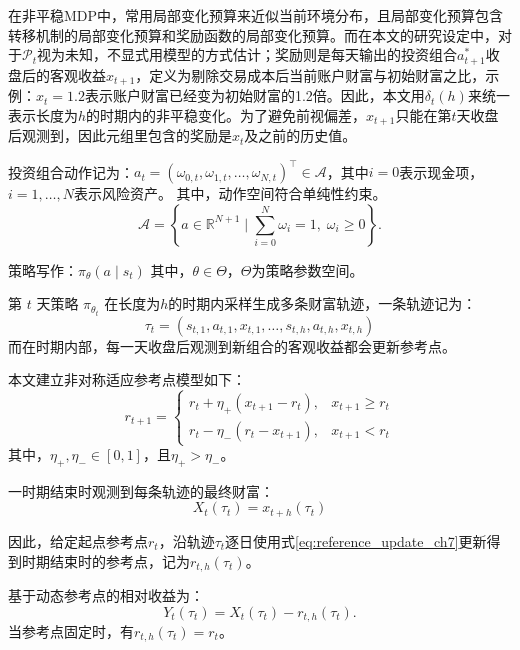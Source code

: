 \documentclass{sufethesismas}
\begin{document}
在非平稳MDP中，常用局部变化预算来近似当前环境分布，且局部变化预算包含转移机制的局部变化预算和奖励函数的局部变化预算\citep{feng2023nonstationary}。而在本文的研究设定中，对于$\mathcal{P}_t$视为未知，不显式用模型的方式估计；奖励则是每天输出的投资组合$a_{t+1}^*$收盘后的客观收益$x_{t+1}$，定义为剔除交易成本后当前账户财富与初始财富之比，示例：$x_t=1.2$表示账户财富已经变为初始财富的1.2倍。因此，本文用$\delta_t(h)$来统一表示长度为$h$的时期内的非平稳变化。为了避免前视偏差，$x_{t+1}$只能在第$t$天收盘后观测到，因此元组里包含的奖励是$x_{t}$及之前的历史值。

投资组合动作记为：$a_t=(\omega_{0,t},\omega_{1,t},\ldots,\omega_{N,t})^\top\in \mathcal{A}$，其中$i=0$表示现金项，$i=1,\dots,N$表示风险资产。
其中，动作空间符合单纯性约束。
\begin{equation*}
\mathcal{A}=\left\{a\in \mathbb{R}^{N+1} \mid \sum_{i=0}^N \omega_i=1,\; \omega_i\ge 0\right\}.
\end{equation*}

策略写作：$\pi_\theta(a\mid s_t)$
其中，$\theta\in\Theta$，$\Theta$为策略参数空间。

第 $t$ 天策略 $\pi_{\theta_t}$ 在长度为$h$的时期内采样生成多条财富轨迹，一条轨迹记为：
\begin{equation*}
\tau_t=(s_{t,1},a_{t,1},x_{t,1},\ldots,s_{t,h},a_{t,h},x_{t,h})
\end{equation*}
而在时期内部，每一天收盘后观测到新组合的客观收益都会更新参考点。

本文建立非对称适应参考点模型如下：
\begin{equation}
\label{eq:reference_update_ch7}
r_{t+1}
=
\begin{cases}
r_t+\eta_+\left(x_{t+1}-r_t\right), & x_{t+1}\ge r_t\\[4pt]
r_t-\eta_-\left(r_t-x_{t+1}\right), & x_{t+1}<r_t
\end{cases}
\end{equation}
其中，$\eta_+,\eta_-\in[0,1]$，且$\eta_+ >\eta_-$。

一时期结束时观测到每条轨迹的最终财富：
\begin{equation}
X_t(\tau_t)=x_{t+h}(\tau_t)
\end{equation}

因此，给定起点参考点$r_t$，沿轨迹$\tau_t$逐日使用式\eqref{eq:reference_update_ch7}更新得到时期结束时的参考点，记为$r_{t,h}(\tau_t)$。

基于动态参考点的相对收益为：
\begin{equation}
Y_t(\tau_t)=X_t(\tau_t)-r_{t,h}(\tau_t).
\end{equation}
当参考点固定时，有$r_{t,h}(\tau_t)=r_t$。
\end{document}
